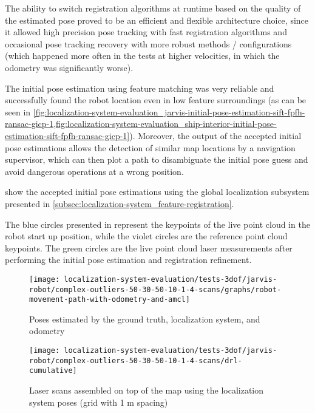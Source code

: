 The ability to switch registration algorithms at runtime based on the quality of the estimated pose proved to be an efficient and flexible architecture choice, since it allowed high precision pose tracking with fast registration algorithms and occasional pose tracking recovery with more robust methods / configurations (which happened more often in the tests at higher velocities, in which the odometry was significantly worse).

The initial pose estimation using feature matching was very reliable and successfully found the robot location even in low feature surroundings (as can be seen in \cref{fig:localization-system-evaluation_jarvis-initial-pose-estimation-sift-fpfh-ransac-gicp-1,fig:localization-system-evaluation_ship-interior-initial-pose-estimation-sift-fpfh-ransac-gicp-1}). Moreover, the output of the accepted initial pose estimations allows the detection of similar map locations by a navigation supervisor, which can then plot a path to disambiguate the initial pose guess and avoid dangerous operations at a wrong position.

 show the accepted initial pose estimations using the global localization subsystem presented in \cref{subsec:localization-system_feature-registration}.

The blue circles presented in  represent the keypoints of the live point cloud in the robot start up position, while the violet circles are the reference point cloud keypoints. The green circles are the live point cloud laser measurements after performing the initial pose estimation and registration refinement.


\begin{figure}[H]
	\centering
	\texttt{[image: localization-system-evaluation/tests-3dof/jarvis-robot/complex-outliers-50-30-50-10-1-4-scans/graphs/robot-movement-path-with-odometry-and-amcl]}
	\caption{Poses estimated by the ground truth, localization system,  and odometry}
	\label{fig:localization-system-evaluation_complex-path-with-outliers-50-30-50-10cm-per-sec-velocity-1-4-scans-paths}
\end{figure}

\begin{figure}[H]
	\centering
	\texttt{[image: localization-system-evaluation/tests-3dof/jarvis-robot/complex-outliers-50-30-50-10-1-4-scans/drl-cumulative]}
	\caption{Laser scans assembled on top of the map using the localization system poses (grid with 1 m spacing)}
	\label{fig:localization-system-evaluation_complex-path-with-outliers-50-30-50-10cm-per-sec-velocity-1-4-scans-drl-cumulative}
\end{figure}

